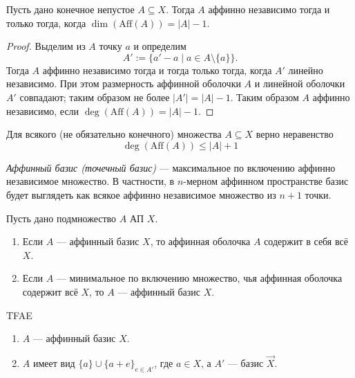 \documentclass[12pt,a4paper]{article}
\newcommand{\Aff}{\ensuremath{\mathrm{Aff}}\xspace}
\begin{document}
    \begin{theorem}
        Пусть дано конечное непустое $A \subseteq X$. Тогда $A$ аффинно независимо тогда и только тогда, когда $\dim(\Aff(A)) = |A| - 1$.
    \end{theorem}

    \begin{proof}
        Выделим из $A$ точку $a$ и определим
        \[A' := \{a' - a \mid a \in A \setminus \{a\}\}.\]
        Тогда $A$ аффинно независимо тогда и тогда только тогда, когда $A'$ линейно независимо. При этом размерность аффинной оболочки $A$ и линейной оболочки $A'$ совпадают; таким образом не более $|A'| = |A| - 1$. Таким образом $A$ аффинно независимо, если $\deg(\Aff(A)) = |A| - 1$.
    \end{proof}

    \begin{corollary}
        Для всякого (не обязательно конечного) множества $A \subseteq X$ верно неравенство
        \[\deg(\Aff(A)) \leqslant |A| + 1\]
    \end{corollary}

    \begin{definition}
        \emph{Аффинный базис (точечный базис)} --- максимальное по включению аффинно независимое множество. В частности, в $n$-мерном аффинном пространстве базис будет выглядеть как всякое аффинно независимое множество из $n+1$ точки.
    \end{definition}

    \begin{lemma}
        Пусть дано подмножество $A$ АП $X$.
        \begin{enumerate}
            \item Если $A$ --- аффинный базис $X$, то аффинная оболочка $A$ содержит в себя всё $X$.
            \item Если $A$ --- минимальное по включению множество, чья аффинная оболочка содержит всё $X$, то $A$ --- аффинный базис $X$.
        \end{enumerate} 
    \end{lemma}

    \begin{lemma}
        TFAE
        \begin{enumerate}
            \item $A$ --- аффинный базис $X$.
            \item $A$ имеет вид $\{a\} \cup \{a + e\}_{e \in A'}$, где $a \in X$, а $A'$ --- базис $\overrightarrow{X}$.
        \end{enumerate}
    \end{lemma}
\end{document}
